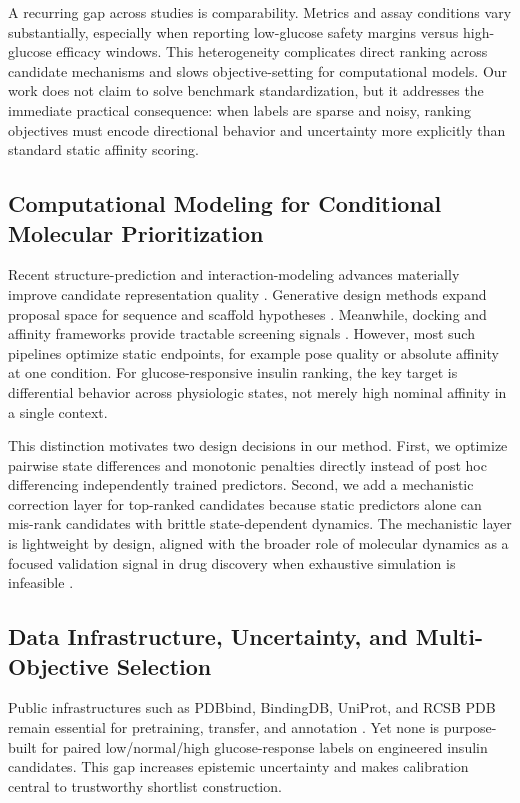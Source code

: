 \documentclass{article} %
\begin{document}
A recurring gap across studies is comparability. Metrics and assay conditions vary substantially, especially when reporting low-glucose safety margins versus high-glucose efficacy windows. This heterogeneity complicates direct ranking across candidate mechanisms and slows objective-setting for computational models. Our work does not claim to solve benchmark standardization, but it addresses the immediate practical consequence: when labels are sparse and noisy, ranking objectives must encode directional behavior and uncertainty more explicitly than standard static affinity scoring.

\subsection{Computational Modeling for Conditional Molecular Prioritization}
Recent structure-prediction and interaction-modeling advances materially improve candidate representation quality \citep{src16,src17,src23,src33,src38}. Generative design methods expand proposal space for sequence and scaffold hypotheses \citep{src18,src19}. Meanwhile, docking and affinity frameworks provide tractable screening signals \citep{src24,src26,src27,src28,src39,src40}. However, most such pipelines optimize static endpoints, for example pose quality or absolute affinity at one condition. For glucose-responsive insulin ranking, the key target is differential behavior across physiologic states, not merely high nominal affinity in a single context.

This distinction motivates two design decisions in our method. First, we optimize pairwise state differences and monotonic penalties directly instead of post hoc differencing independently trained predictors. Second, we add a mechanistic correction layer for top-ranked candidates because static predictors alone can mis-rank candidates with brittle state-dependent dynamics. The mechanistic layer is lightweight by design, aligned with the broader role of molecular dynamics as a focused validation signal in drug discovery when exhaustive simulation is infeasible \citep{src36}.

\subsection{Data Infrastructure, Uncertainty, and Multi-Objective Selection}
Public infrastructures such as PDBbind, BindingDB, UniProt, and RCSB PDB remain essential for pretraining, transfer, and annotation \citep{src29,src30,src31,src32,src37}. Yet none is purpose-built for paired low/normal/high glucose-response labels on engineered insulin candidates. This gap increases epistemic uncertainty and makes calibration central to trustworthy shortlist construction.
\end{document}
